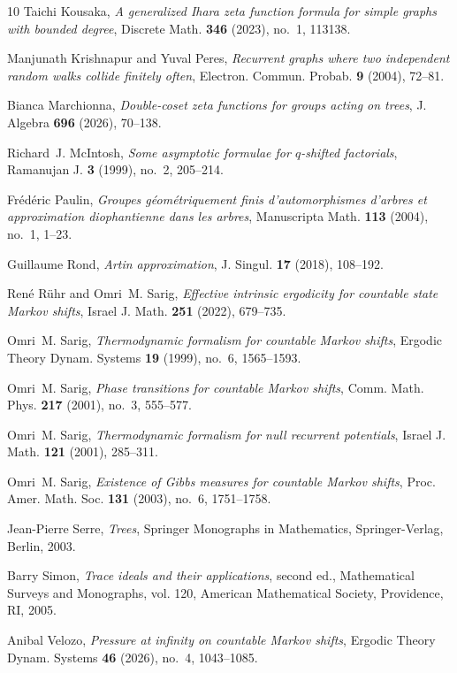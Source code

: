 \documentclass[11pt,reqno]{amsart}
\numberwithin{equation}{section}
\theoremstyle{definition}
\theoremstyle{remark}
\begin{document}
\begin{thebibliography}{10}
Taichi Kousaka, \emph{A generalized {Ihara} zeta function formula for simple
  graphs with bounded degree}, Discrete Math. \textbf{346} (2023), no.~1,
  113138.

Manjunath Krishnapur and Yuval Peres, \emph{Recurrent graphs where two
  independent random walks collide finitely often}, Electron. Commun. Probab.
  \textbf{9} (2004), 72--81.

Bianca Marchionna, \emph{Double-coset zeta functions for groups acting on
  trees}, J. Algebra \textbf{696} (2026), 70--138.

Richard~J. McIntosh, \emph{Some asymptotic formulae for {$q$}-shifted
  factorials}, Ramanujan J. \textbf{3} (1999), no.~2, 205--214.

Fr{\'e}d{\'e}ric Paulin, \emph{Groupes g{\'e}om{\'e}triquement finis
  d'automorphismes d'arbres et approximation diophantienne dans les arbres},
  Manuscripta Math. \textbf{113} (2004), no.~1, 1--23.

Guillaume Rond, \emph{Artin approximation}, J. Singul. \textbf{17} (2018),
  108--192.

Ren{\'e} R{\"u}hr and Omri~M. Sarig, \emph{Effective intrinsic ergodicity for
  countable state {Markov} shifts}, Israel J. Math. \textbf{251} (2022),
  679--735.

Omri~M. Sarig, \emph{Thermodynamic formalism for countable {Markov} shifts},
  Ergodic Theory Dynam. Systems \textbf{19} (1999), no.~6, 1565--1593.

Omri~M. Sarig, \emph{Phase transitions for countable {Markov} shifts}, Comm.
  Math. Phys. \textbf{217} (2001), no.~3, 555--577.

Omri~M. Sarig, \emph{Thermodynamic formalism for null recurrent potentials},
  Israel J. Math. \textbf{121} (2001), 285--311.

Omri~M. Sarig, \emph{Existence of {Gibbs} measures for countable {Markov}
  shifts}, Proc. Amer. Math. Soc. \textbf{131} (2003), no.~6, 1751--1758.

Jean-Pierre Serre, \emph{Trees}, Springer Monographs in Mathematics,
  Springer-Verlag, Berlin, 2003.

Barry Simon, \emph{Trace ideals and their applications}, second ed.,
  Mathematical Surveys and Monographs, vol. 120, American Mathematical Society,
  Providence, RI, 2005.

Anibal Velozo, \emph{Pressure at infinity on countable {Markov} shifts},
  Ergodic Theory Dynam. Systems \textbf{46} (2026), no.~4, 1043--1085.

\end{thebibliography}
\end{document}
